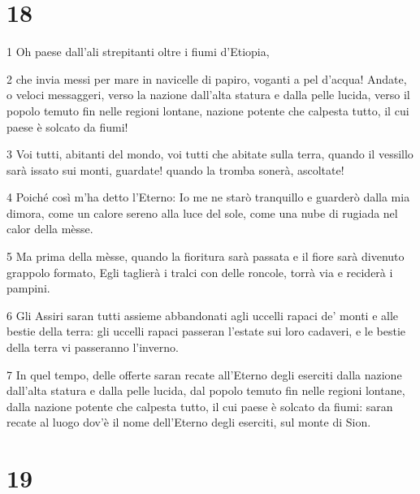 \chapter{18}

\par 1 Oh paese dall'ali strepitanti oltre i fiumi d'Etiopia,
\par 2 che invia messi per mare in navicelle di papiro, voganti a pel d'acqua! Andate, o veloci messaggeri, verso la nazione dall'alta statura e dalla pelle lucida, verso il popolo temuto fin nelle regioni lontane, nazione potente che calpesta tutto, il cui paese è solcato da fiumi!
\par 3 Voi tutti, abitanti del mondo, voi tutti che abitate sulla terra, quando il vessillo sarà issato sui monti, guardate! quando la tromba sonerà, ascoltate!
\par 4 Poiché così m'ha detto l'Eterno: Io me ne starò tranquillo e guarderò dalla mia dimora, come un calore sereno alla luce del sole, come una nube di rugiada nel calor della mèsse.
\par 5 Ma prima della mèsse, quando la fioritura sarà passata e il fiore sarà divenuto grappolo formato, Egli taglierà i tralci con delle roncole, torrà via e reciderà i pampini.
\par 6 Gli Assiri saran tutti assieme abbandonati agli uccelli rapaci de' monti e alle bestie della terra: gli uccelli rapaci passeran l'estate sui loro cadaveri, e le bestie della terra vi passeranno l'inverno.
\par 7 In quel tempo, delle offerte saran recate all'Eterno degli eserciti dalla nazione dall'alta statura e dalla pelle lucida, dal popolo temuto fin nelle regioni lontane, dalla nazione potente che calpesta tutto, il cui paese è solcato da fiumi: saran recate al luogo dov'è il nome dell'Eterno degli eserciti, sul monte di Sion.

\chapter{19}


